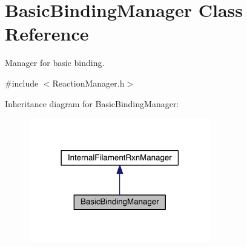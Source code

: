\hypertarget{classBasicBindingManager}{\section{Basic\+Binding\+Manager Class Reference}
\label{classBasicBindingManager}
}


Manager for basic binding.  




{\ttfamily \#include $<$Reaction\+Manager.\+h$>$}



Inheritance diagram for Basic\+Binding\+Manager\+:\nopagebreak
\begin{figure}[H]
\begin{center}
\leavevmode
\includegraphics[width=225pt]{classBasicBindingManager__inherit__graph}
\end{center}
\end{figure}


